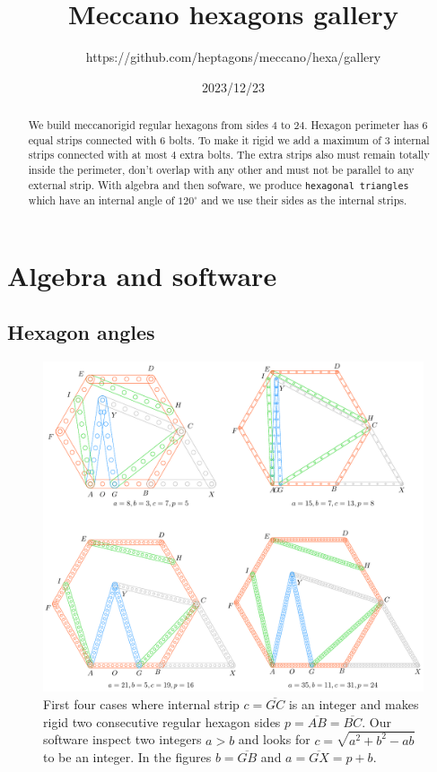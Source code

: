 \documentclass[11pt]{article}
\title{Meccano hexagons gallery}
\author{https://github.com/heptagons/meccano/hexa/gallery}
\date{2023/12/23}
\begin{document}
\maketitle
\begin{abstract}
We build meccano\meccanoref rigid regular hexagons from sides $4$ to $24$. Hexagon perimeter has $6$ equal strips connected with $6$ bolts. To make it rigid we add a maximum of $3$ internal strips connected with at most $4$ extra bolts. The extra strips also must remain totally inside the perimeter, don't overlap with any other and must not be parallel to any external strip. With algebra and then sofware, we produce \texttt{hexagonal triangles} which have an internal angle of $120^\circ$ and we use their sides as the internal strips.
\end{abstract}

\section{Algebra and software}

\subsection{Hexagon angles}

\begin{figure}[h]
\centering
\includegraphics[scale=0.9]{build/hexa-builder-a}
\caption{First four cases where internal strip $c = \overline{GC}$ is an integer and makes rigid two consecutive regular hexagon sides $p = \overline{AB} = \overline{BC}$. Our software inspect two integers $a > b$ and looks for $c = \sqrt{a^2+b^2-ab}$ to be an integer. In the figures $b = \overline{GB}$ and $a = \overline{GX} = p + b$. }
\label{fig:builder-a}
\end{figure}
\end{document}
